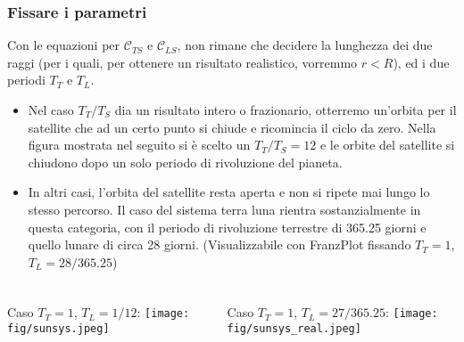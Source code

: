 \documentclass{beamer}
\newcommand{\fig}{figures} %
\newcommand{\frnzplt}{FranzPlot }
\begin{document}
\begin{frame}
\frametitle{Fissare i parametri} 
Con le equazioni per $\mathcal{C}_{TS}$ e $\mathcal{C}_{LS}$, non rimane che
decidere la lunghezza dei due raggi (per i quali, per ottenere un risultato
realistico, vorremmo $r<R$), ed i due periodi $T_T$ e $T_L$.  

\begin{itemize}
\item Nel caso $T_T/T_S$ dia un risultato intero o frazionario, otterremo
un'orbita per il satellite che ad un certo punto si chiude e ricomincia il
ciclo da zero. Nella figura mostrata nel seguito si \`e scelto un $T_T/T_S =
12$ e le orbite del satellite si chiudono dopo un solo periodo di rivoluzione
del pianeta.  
\item In altri casi, l'orbita del satellite resta aperta e non si
ripete mai lungo lo stesso percorso. Il caso del sistema terra luna rientra sostanzialmente in questa categoria, con il periodo di rivoluzione terrestre di 365.25 giorni e quello lunare di circa 28 giorni. (Visualizzabile con \frnzplt fissando $T_T =1$, $T_L = 28/365.25$)
\end{itemize}
\end{frame}

\begin{frame}
\frametitle{}

\begin{columns}
\begin{column}{0.5\textwidth}
Caso $T_T = 1$, $T_L = 1/12$:
\texttt{[image: \\fig/sunsys.jpeg]}
\end{column}
\begin{column}{0.5\textwidth}
Caso $T_T = 1$, $T_L = 27/365.25$:
\texttt{[image: \\fig/sunsys\_real.jpeg]}
\end{column}
\end{columns}
\end{frame}
\end{document}
